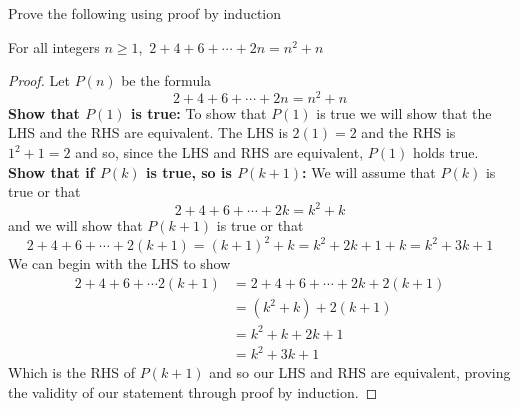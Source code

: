 \documentclass[addpoints]{exam}
\begin{document}
\begin{questions}
    \question Prove the following using proof by induction 
    \begin{center}
      For all integers $n \geq 1$, $\displaystyle\, 2 + 4 + 6 + \cdots + 2n = n^2 + n$
    \end{center}
    \begin{solution}[\stretch{1}]
      \begin{proof}
        Let $P(n)$ be the formula 
        \[
          2 + 4 + 6 + \cdots + 2n = n^2 + n
        \]
        \textbf{Show that $P(1)$ is true:} To show that $P(1)$ is true we will show that the LHS and the RHS are equivalent. The LHS is $2(1)=2$ and the RHS is $1^2 + 1 = 2$ and so, since the LHS and RHS are equivalent, $P(1)$ holds true.
        \newline\textbf{Show that if $P(k)$ is true, so is $P(k+1)$:} We will assume that $P(k)$ is true or that 
        \[
          2 + 4 + 6 + \cdots + 2k = k^2 + k 
        \] 
        and we will show that $P(k+1)$ is true or that 
        \[
          2 + 4 + 6 + \cdots + 2(k+1) = (k+1)^2 + k = k^2 + 2k + 1 + k = k^2 + 3k + 1
        \]
        We can begin with the LHS to show 
        \begin{align*}
          2 + 4 + 6 + \cdots 2(k+1) &= 2 + 4 + 6 + \cdots + 2k + 2(k+1) \\ 
          &= (k^2 + k) + 2(k+1) \\ 
          &= k^2 + k + 2k + 1 \\ 
          &= k^2 + 3k + 1
        \end{align*}
        Which is the RHS of $P(k+1)$ and so our LHS and RHS are equivalent, proving the validity of our statement through proof by induction.
      \end{proof}
    \end{solution}

    \newpage 


\end{questions}
\end{document}
